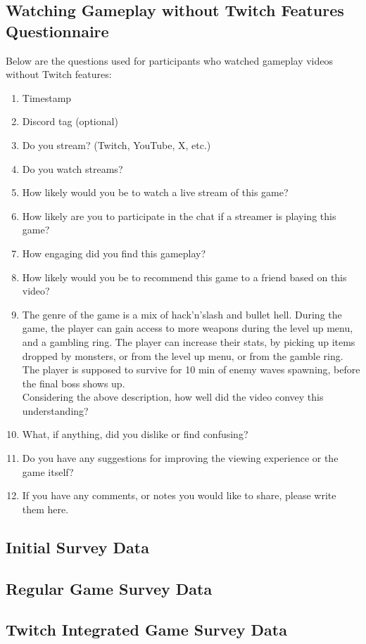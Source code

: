 \documentclass[conference]{IEEEtran}
\begin{document}
\subsection{Watching Gameplay without Twitch Features Questionnaire}
Below are the questions used for participants who watched gameplay videos without Twitch features:
\begin{enumerate}
    \item Timestamp
    \item Discord tag (optional)
    \item Do you stream? (Twitch, YouTube, X, etc.)
    \item Do you watch streams?
    \item How likely would you be to watch a live stream of this game?
    \item How likely are you to participate in the chat if a streamer is playing this game?
    \item How engaging did you find this gameplay?
    \item How likely would you be to recommend this game to a friend based on this video?
    \item The genre of the game is a mix of hack'n'slash and bullet hell. During the game, the player can gain access to more weapons during the level up menu, and a gambling ring. The player can increase their stats, by picking up items dropped by monsters, or from the level up menu, or from the gamble ring. The player is supposed to survive for 10 min of enemy waves spawning, before the final boss shows up.\\
    Considering the above description, how well did the video convey this understanding?
    \item What, if anything, did you dislike or find confusing?
    \item Do you have any suggestions for improving the viewing experience or the game itself?
    \item If you have any comments, or notes you would like to share, please write them here.
\end{enumerate}

\subsection{Initial Survey Data}

\subsection{Regular Game Survey Data}

\subsection{Twitch Integrated Game Survey Data}
\end{document}
